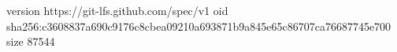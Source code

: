 version https://git-lfs.github.com/spec/v1
oid sha256:c3608837a690c9176c8cbea09210a693871b9a845e65c86707ca76687745e700
size 87544
